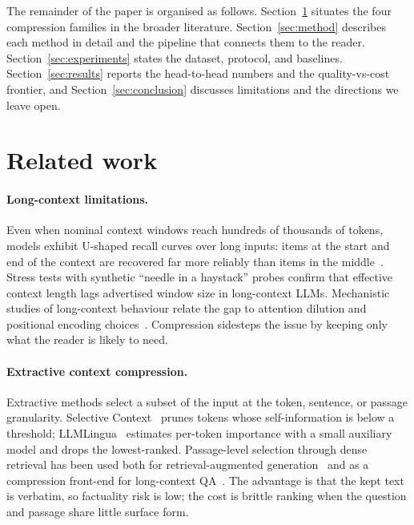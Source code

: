\documentclass[10pt,twocolumn]{article}
\begin{document}
The remainder of the paper is organised as follows. Section~\ref{sec:related_work} situates the four compression families in the broader literature. Section~\ref{sec:method} describes each method in detail and the pipeline that connects them to the reader. Section~\ref{sec:experiments} states the dataset, protocol, and baselines. Section~\ref{sec:results} reports the head-to-head numbers and the quality-vs-cost frontier, and Section~\ref{sec:conclusion} discusses limitations and the directions we leave open.

\section{Related work}
\label{sec:related_work}

\paragraph{Long-context limitations.}
Even when nominal context windows reach hundreds of thousands of tokens, models exhibit U-shaped recall curves over long inputs: items at the start and end of the context are recovered far more reliably than items in the middle~\cite{liu2023lostmiddle}. Stress tests with synthetic ``needle in a haystack'' probes confirm that effective context length lags advertised window size in long-context LLMs. Mechanistic studies of long-context behaviour relate the gap to attention dilution and positional encoding choices~\cite{press2022alibi,chen2023extending}. Compression sidesteps the issue by keeping only what the reader is likely to need.

\paragraph{Extractive context compression.}
Extractive methods select a subset of the input at the token, sentence, or passage granularity. Selective Context~\cite{li2023unifying} prunes tokens whose self-information is below a threshold; LLMLingua~\cite{jiang2023llmlingua} estimates per-token importance with a small auxiliary model and drops the lowest-ranked. Passage-level selection through dense retrieval has been used both for retrieval-augmented generation~\cite{lewis2020rag,izacard2022atlas} and as a compression front-end for long-context QA~\cite{xu2023recomp}. The advantage is that the kept text is verbatim, so factuality risk is low; the cost is brittle ranking when the question and passage share little surface form.
\end{document}
